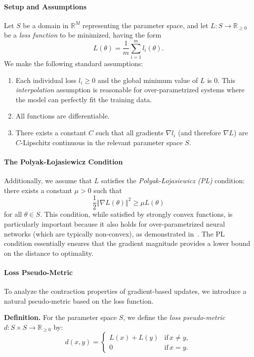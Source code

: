 \documentclass[10pt]{article} %
\theoremstyle{plain}
\theoremstyle{definition}
\theoremstyle{remark}
\begin{document}
\paragraph{Setup and Assumptions}
Let $S$ be a domain in $\mathbb{R}^{M}$ representing the parameter space, and let $L:S\rightarrow\mathbb{R}_{\geq0}$ be
a \emph{loss function} to be minimized, having the form
\[
    L(\theta)=\frac{1}{m}\sum_{i=1}^{m}l_{i}(\theta).
\]
We make the following standard assumptions:
\begin{enumerate}
    \item Each individual loss $l_{i}\geq0$ and the global minimum value of $L$ is $0$. This \emph{interpolation} assumption is reasonable for over-parametrized systems where the model can perfectly fit the training data.
    \item All functions are differentiable.
    \item There exists a constant $C$ such that all gradients $\nabla l_{i}$ (and therefore $\nabla L$) are $C$-Lipschitz continuous in the relevant parameter space $S$.
\end{enumerate} 
\paragraph{The Polyak-Łojasiewicz Condition}
Additionally, we assume that $L$ satisfies
the \emph{Polyak-Łojasiewicz (PL)} condition: there exists a constant $\mu>0$ such that
\[
    \frac{1}{2}\left\Vert \nabla L(\theta)\right\Vert ^{2}\geq\mu L(\theta)
\]
for all $\theta\in S$. This condition, while satisfied by strongly convex
functions, is particularly important because it also holds for
over-parametrized neural networks (which are typically non-convex),
as demonstrated in~\cite{Liu2022}. The PL condition essentially ensures that the gradient magnitude provides a lower bound on the distance to optimality.

\paragraph{Loss Pseudo-Metric}
To analyze the contraction properties of gradient-based updates, we introduce a natural pseudo-metric based on the loss function. 

\textbf{Definition.} For the parameter space $S$, we define the \emph{loss pseudo-metric} $d: S \times S \to \mathbb{R}_{\geq 0}$ by:
\begin{equation*}
    d(x,y) = 
    \begin{cases}
        L(x)+L(y) & \text{if}\, x \neq y, \\
        0 & \text{if}\, x = y.
    \end{cases}
\end{equation*}
\end{document}
